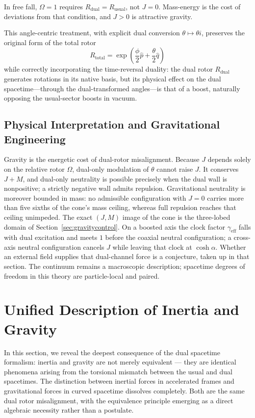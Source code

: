 \documentclass[a4paper]{article}
\begin{document}
In free fall, $\Omega=1$ requires $R_{\mathrm{dual}}=R_{\mathrm{usual}}$, not $J=0$. Mass-energy is the cost of deviations from that condition, and $J>0$ is attractive gravity.

This angle-centric treatment, with explicit dual conversion $\theta \mapsto \theta i$, preserves the original form of the total rotor
\[
R_\text{total} = \exp\left( \frac{\phi}{2} \hat{p} + \frac{\theta}{2} \hat{q} \right)
\]
while correctly incorporating the time-reversal duality: the dual rotor $R_\text{dual}$ generates rotations in its native basis, but its physical effect on the dual spacetime—through the dual-transformed angles—is that of a boost, naturally opposing the usual-sector boosts in vacuum.

\subsection{Physical Interpretation and Gravitational Engineering}

Gravity is the energetic cost of dual-rotor misalignment. Because $J$ depends solely on the relative rotor $\Omega$, dual-only modulation of $\theta$ cannot raise $J$. It conserves $J+M$, and dual-only neutrality is possible precisely when the dual wall is nonpositive; a strictly negative wall admits repulsion. Gravitational neutrality is moreover bounded in mass: no admissible configuration with $J=0$ carries more than five sixths of the cone's mass ceiling, whereas full repulsion reaches that ceiling unimpeded. The exact $(J,M)$ image of the cone is the three-lobed domain of Section~\ref{sec:gravitycontrol}. On a boosted axis the clock factor $\gamma_{\mathrm{eff}}$ falls with dual excitation and meets $1$ before the coaxial neutral configuration; a cross-axis neutral configuration cancels $J$ while leaving that clock at $\cosh\alpha$. Whether an external field supplies that dual-channel force is a conjecture, taken up in that section. The continuum remains a macroscopic description; spacetime degrees of freedom in this theory are particle-local and paired.

\section{Unified Description of Inertia and Gravity}
\label{sec:unified}

In this section, we reveal the deepest consequence of the dual spacetime formalism: inertia and gravity are not merely equivalent — they are identical phenomena arising from the torsional mismatch between the usual and dual spacetimes. The distinction between inertial forces in accelerated frames and gravitational forces in curved spacetime dissolves completely. Both are the same dual rotor misalignment, with the equivalence principle emerging as a direct algebraic necessity rather than a postulate.
\end{document}
